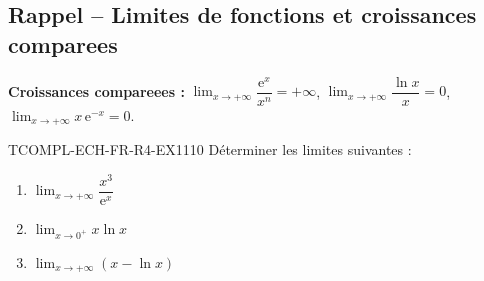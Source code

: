 

\subsection*{Rappel -- Limites de fonctions et croissances comparees}

\textbf{Croissances compareees :} $\lim_{x \to +\infty} \dfrac{\mathrm{e}^x}{x^n} = +\infty$, $\lim_{x \to +\infty} \dfrac{\ln x}{x} = 0$, $\lim_{x \to +\infty} x\,\mathrm{e}^{-x} = 0$.

\begin{exercice}{TCOMPL-ECH-FR-R4-EX1}{1}{10}
Déterminer les limites suivantes :
\begin{enumerate}
  \item $\lim_{x \to +\infty} \dfrac{x^3}{\mathrm{e}^x}$
  \item $\lim_{x \to 0^+} x \ln x$
  \item $\lim_{x \to +\infty} \left(x - \ln x\right)$
\end{enumerate}
\end{exercice}

